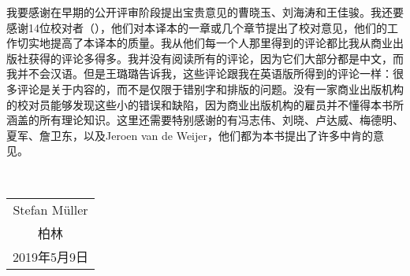 我要感谢在早期的公开评审阶段提出宝贵意见的曹晓玉、刘海涛和王佳骏。我还要感谢14位校对者（\makeatletter\@proofreader\makeatother），他们对本译本的一章或几个章节提出了校对意见，他们的工作切实地提高了本译本的质量。我从他们每一个人那里得到的评论都比我从商业出版社获得的评论多得多。我并没有阅读所有的评论，因为它们大部分都是中文，而我并不会汉语。但是王璐璐告诉我，这些评论跟我在英语版所得到的评论一样：很多评论是关于内容的，而不是仅限于错别字和排版的问题。没有一家商业出版机构的校对员能够发现这些小的错误和缺陷，因为商业出版机构的雇员并不懂得本书所涵盖的所有理论知识。这里还需要特别感谢的有冯志伟、刘晓、卢达威、梅德明、夏军、詹卫东，以及Jeroen van de Weijer，他们都为本书提出了许多中肯的意见。

~\medskip

\noindent
\begin{flushright}
\begin{tabular}{c}
Stefan Müller\\
柏林\\
2019年5月9日\\
\end{tabular}
\end{flushright}

